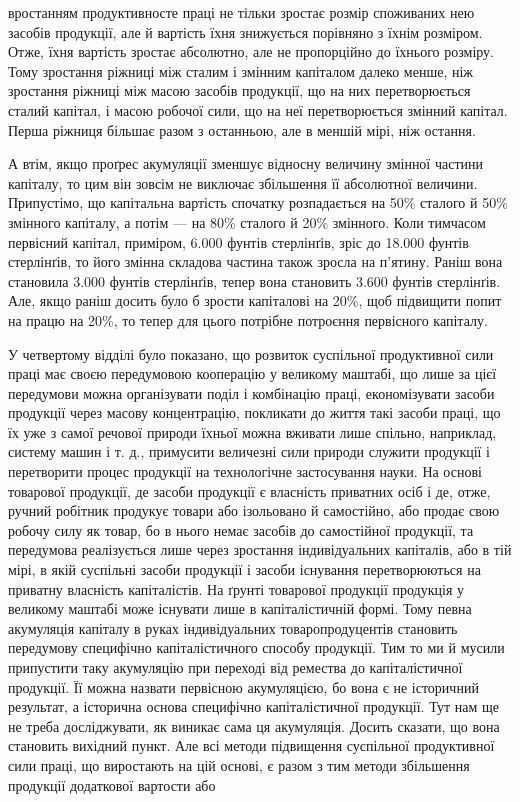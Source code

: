 \parcont{}  %
вростанням продуктивносте праці не тільки зростає розмір споживаних
нею засобів продукції, але й вартість їхня знижується
порівняно з їхнім розміром. Отже, їхня вартість зростає абсолютно,
але не пропорційно до їхнього розміру. Тому зростання
ріжниці між сталим і змінним капіталом далеко менше, ніж зростання
ріжниці між масою засобів продукції, що на них перетворюється
сталий капітал, і масою робочої сили, що на неї перетворюється
змінний капітал. Перша ріжниця більшає разом з останньою,
але в меншій мірі, ніж остання.

А втім, якщо проґрес акумуляції зменшує відносну величину
змінної частини капіталу, то цим він зовсім не виключає збільшення
її абсолютної величини. Припустімо, що капітальна вартість спочатку
розпадається на 50\% сталого й 50\% змінного капіталу,
а потім — на 80\% сталого й 20\% змінного. Коли тимчасом первісний
капітал, приміром, 6.000 фунтів стерлінґів, зріс до 18.000
фунтів стерлінґів, то його змінна складова частина також зросла
на п’ятину. Раніш вона становила 3.000 фунтів стерлінґів, тепер
вона становить 3.600 фунтів стерлінґів. Але, якщо раніш
досить було б зрости капіталові на 20\%, щоб підвищити попит
на працю на 20\%, то тепер для цього потрібне потроєння первісного
капіталу.

У четвертому відділі було показано, що розвиток суспільної
продуктивної сили праці має своєю передумовою кооперацію у
великому маштабі, що лише за цієї передумови можна організувати
поділ і комбінацію праці, економізувати засоби продукції
через масову концентрацію, покликати до життя такі засоби
праці, що їх уже з самої речової природи їхньої можна вживати
лише спільно, наприклад, систему машин і т. д., примусити величезні
сили природи служити продукції і перетворити процес продукції
на технологічне застосування науки. На основі товарової
продукції, де засоби продукції є власність приватних осіб і де,
отже, ручний робітник продукує товари або ізольовано й самостійно,
або продає свою робочу силу як товар, бо в нього немає
засобів до самостійної продукції, та передумова реалізується
лише через зростання індивідуальних капіталів, або в тій мірі,
в якій суспільні засоби продукції і засоби існування перетворюються
на приватну власність капіталістів. На ґрунті товарової
продукції продукція у великому маштабі може існувати лише в
капіталістичній формі. Тому певна акумуляція капіталу в руках
індивідуальних товаропродуцентів становить передумову специфічно
капіталістичного способу продукції. Тим то ми й мусили
припустити таку акумуляцію при переході від ремества до капіталістичної
продукції. Її можна назвати первісною акумуляцією,
бо вона є не історичний результат, а історична основа специфічно
капіталістичної продукції. Тут нам ще не треба досліджувати,
як виникає сама ця акумуляція. Досить сказати, що вона становить
вихідний пункт. Але всі методи підвищення суспільної
продуктивної сили праці, що виростають на цій основі, є разом
з тим методи збільшення продукції додаткової вартости або
\parbreak{}  %
